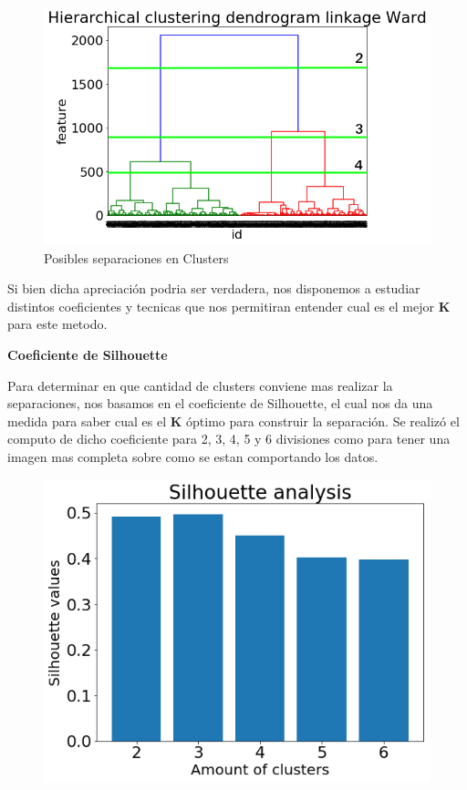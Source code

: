 \begin{figure}[H]
    \centering
    \includegraphics[width=\textwidth]{img/imagenes/jerarquico_AF/dendongrama_ward_clusters.png}
    \caption{Posibles separaciones en Clusters}
    \label{fig:clusters}
\end{figure}

Si bien dicha apreciación podria ser verdadera, nos disponemos a estudiar distintos coeficientes y tecnicas que nos permitiran entender cual es el mejor \textbf{K} para este metodo.

\begin{center} \textbf{Coeficiente de Silhouette} \end{center}
Para determinar en que cantidad de clusters conviene mas realizar la separaciones, nos basamos en el coeficiente de Silhouette, el cual nos da una medida para saber cual es el \textbf{K} óptimo para construir la separación. Se realizó el computo de dicho coeficiente para 2, 3, 4, 5 y 6 divisiones como para tener una imagen mas completa sobre como se estan comportando los datos.

\begin{figure}[H]
    \centering
    \includegraphics[width=\textwidth]{img/imagenes/jerarquico_AF/silhouette_general.png}
    \label{fig:silGeneral}
\end{figure}

